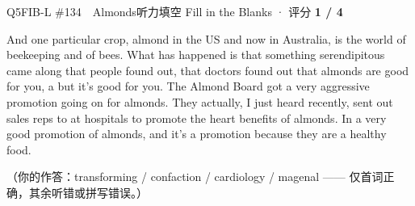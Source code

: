 \begin{qblock}{Q5\quad FIB-L \#134\ \ Almonds}{听力填空 Fill in the Blanks · 评分 \textcolor{cAccent}{\bfseries 1 / 4}}
\begin{promptbox}
And one particular crop, almond in the US and now in Australia, is  the world of beekeeping and of bees. What has happened is that something serendipitous came along that people found out, that doctors found out that almonds are good for you, a  but it's good for you. The Almond Board got a very aggressive promotion going on for almonds. They actually, I just heard recently, sent out sales reps to  at hospitals to promote the heart benefits of almonds. In a very good promotion of almonds, and it's a  promotion because they are a healthy food.
\end{promptbox}
\par{\footnotesize\color{gray}（你的作答：transforming / confaction / cardiology / magenal —— 仅首词正确，其余听错或拼写错误。）}
\end{qblock}

